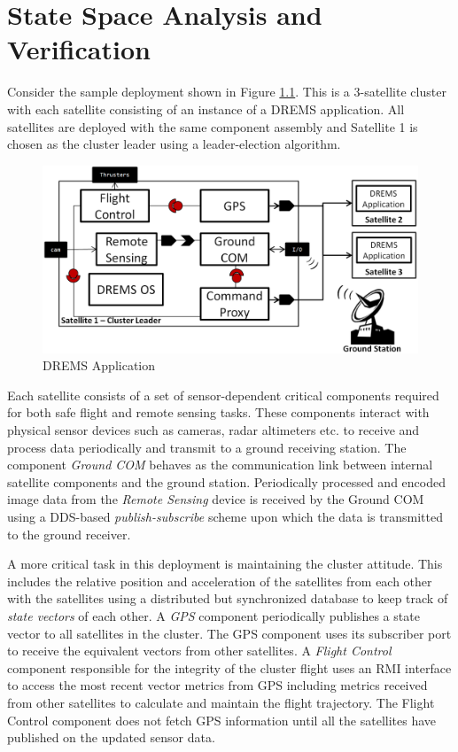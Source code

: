 \chapter{State Space Analysis and Verification}
\label{chapter:analysis}

Consider the sample deployment shown in Figure \ref{fig:CT}. This is a 3-satellite cluster with each satellite consisting of an instance of a DREMS application. All satellites are deployed with the same component assembly and Satellite 1 is chosen as the cluster leader using a leader-election algorithm. 

\begin{figure}[htb]
	\centering
	\includegraphics[width=\textwidth]{./img/Case_Study_Fixed.png}
	\caption{DREMS Application}
	\label{fig:CT}
\end{figure}

Each satellite consists of a set of sensor-dependent critical components required for both safe flight and remote sensing tasks. These components interact with physical sensor devices such as cameras, radar altimeters etc. to receive and process data periodically and transmit to a ground receiving station. The component \emph{Ground COM} behaves as the communication link between internal satellite components and the ground station. Periodically processed and encoded image data from the \emph{Remote Sensing} device is received by the Ground COM using a DDS-based \emph{publish-subscribe} scheme upon which the data is transmitted to the ground receiver. 

A more critical task in this deployment is maintaining the cluster attitude. This includes the relative position and acceleration of the satellites from each other with the satellites using a distributed but synchronized database to keep track of \emph{state vectors} of each other. A \emph{GPS} component periodically publishes a state vector to all satellites in the cluster. The GPS component uses its subscriber port to receive the equivalent vectors from other satellites. A \emph{Flight Control} component responsible for the integrity of the cluster flight uses an RMI interface to access the most recent vector metrics from GPS including metrics received from other satellites to calculate and maintain the flight trajectory. The Flight Control component does not fetch GPS information until all the satellites have published on the updated sensor data. 

